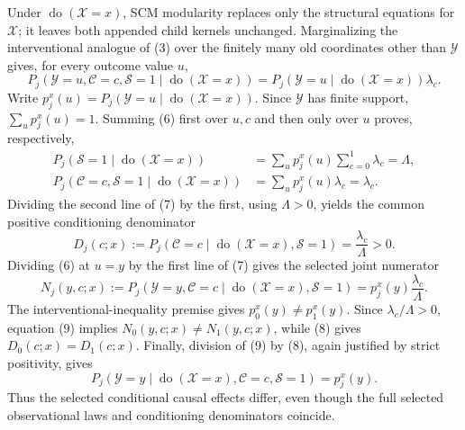 Under \(\operatorname{do}(\mathcal X=x)\), SCM modularity replaces only the structural equations for \(\mathcal X\); it leaves both appended child kernels unchanged. Marginalizing the interventional analogue of (3) over the finitely many old coordinates other than \(\mathcal Y\) gives, for every outcome value \(u\),
\[
 P_j(\mathcal Y=u,\mathcal C=c,\mathcal S=1
      \mid\operatorname{do}(\mathcal X=x))
 =P_j(\mathcal Y=u\mid\operatorname{do}(\mathcal X=x))
  \lambda_c.                                             \tag{6}
\]
Write \(p_j^x(u)=P_j(\mathcal Y=u\mid\operatorname{do}(\mathcal X=x))\). Since \(\mathcal Y\) has finite support, \(\sum_u p_j^x(u)=1\). Summing (6) first over \(u,c\) and then only over \(u\) proves, respectively,
\[
\begin{aligned}
 P_j(\mathcal S=1\mid\operatorname{do}(\mathcal X=x))
   &=\sum_u p_j^x(u)\sum_{c=0}^1\lambda_c=\Lambda,\\
 P_j(\mathcal C=c,\mathcal S=1
      \mid\operatorname{do}(\mathcal X=x))
   &=\sum_u p_j^x(u)\lambda_c=\lambda_c.                 \tag{7}
\end{aligned}
\]
Dividing the second line of (7) by the first, using \(\Lambda>0\), yields the common positive conditioning denominator
\[
 D_j(c;x):=P_j(\mathcal C=c\mid
       \operatorname{do}(\mathcal X=x),\mathcal S=1)
 =\frac{\lambda_c}{\Lambda}>0.                           \tag{8}
\]
Dividing (6) at \(u=y\) by the first line of (7) gives the selected joint numerator
\[
 N_j(y,c;x):=P_j(\mathcal Y=y,\mathcal C=c\mid
       \operatorname{do}(\mathcal X=x),\mathcal S=1)
 =p_j^x(y)\frac{\lambda_c}{\Lambda}.                     \tag{9}
\]
The interventional-inequality premise gives \(p_0^x(y)\ne p_1^x(y)\). Since \(\lambda_c/\Lambda>0\), equation (9) implies \(N_0(y,c;x)\ne N_1(y,c;x)\), while (8) gives \(D_0(c;x)=D_1(c;x)\). Finally, division of (9) by (8), again justified by strict positivity, gives
\[
 P_j(\mathcal Y=y\mid\operatorname{do}(\mathcal X=x),
       \mathcal C=c,\mathcal S=1)
 =p_j^x(y).                                               \tag{10}
\]
Thus the selected conditional causal effects differ, even though the full selected observational laws and conditioning denominators coincide.


